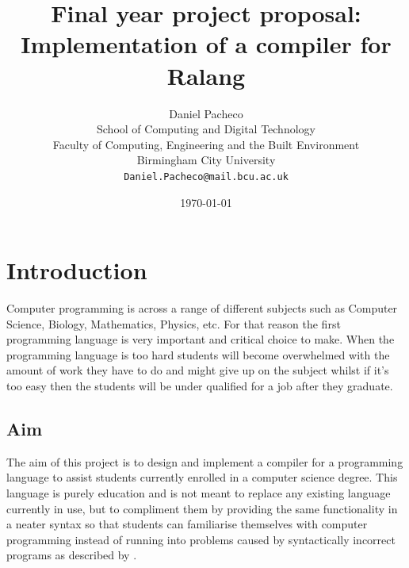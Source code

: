 \documentclass[a4paper]{article}
\begin{document}
	
\title{Final year project proposal:\\Implementation of a compiler for Ralang}
\author{Daniel Pacheco\\
	School of Computing and Digital Technology\\
    Faculty of Computing, Engineering and the Built Environment\\
    Birmingham City University\\
	\texttt{Daniel.Pacheco@mail.bcu.ac.uk}}
\date{\today}
\maketitle

\newpage
\tableofcontents

\renewcommand{\thesection}{\Roman{section}.}

\newpage
\section{Introduction}
Computer programming is across a range of different subjects such as Computer Science, Biology, Mathematics, Physics, etc. For that reason the first programming language is very important and critical choice to make. When the programming language is too hard students will become overwhelmed with the amount of work they have to do and might give up on the subject whilst if it's too easy then the students will be under qualified for a job after they graduate.

\subsection{Aim}
The aim of this project is to design and implement a compiler for a programming language to assist students currently enrolled in a computer science degree. This language is purely education and is not meant to replace any existing language currently in use, but to compliment them by providing the same functionality in a neater syntax so that students can familiarise themselves with computer programming instead of running into problems caused by syntactically incorrect programs as described by \textcite{KrpanBilobrk2011}.
\end{document}
